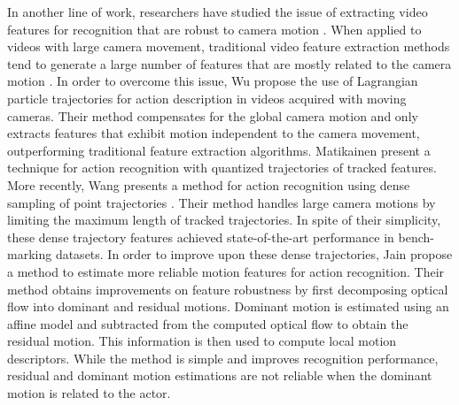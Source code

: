 In another line of work, researchers have studied the issue of extracting video features for recognition
that are robust to camera motion \cite{Jain2013,Gross2012,Wu2011a}. When applied to videos with large camera
movement, traditional video feature extraction methods tend to generate a large number of features that are
mostly related to the camera motion \cite{Dollar2005, Laptev2005, WangCVPR2011}. In order to overcome this
issue, Wu \etal \cite{Wu2011a} propose the use of Lagrangian particle trajectories for action description in
videos acquired with moving cameras. Their method compensates for the global camera motion and only extracts
features that exhibit motion independent to the camera movement, outperforming traditional feature
extraction algorithms. Matikainen \etal \cite{Matikainen2009} present a technique for action recognition
with quantized trajectories of tracked features. More recently, Wang \etal presents a method for action
recognition using dense sampling of point trajectories \cite{WangCVPR2011}. Their method handles large
camera motions by limiting the maximum length of tracked trajectories. In spite of their simplicity, these
dense trajectory features achieved state-of-the-art performance in bench-marking datasets. In order to
improve upon these dense trajectories, Jain \etal \cite{Jain2013} propose a method to estimate more reliable
motion features for action recognition. Their method obtains improvements on feature robustness  by first
decomposing optical flow into dominant and residual motions. Dominant motion is estimated using an affine
model and subtracted from the computed optical flow to obtain the residual motion. This information is then
used to compute local motion descriptors. While the method is simple and improves recognition performance,
residual and dominant motion estimations are not reliable when the dominant motion is related to the actor.